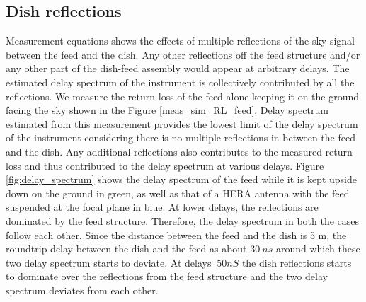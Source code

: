 \documentclass[twocolumn]{emulateapj}
\begin{document}
\subsection{\textbf{Dish reflections}}
Measurement equations shows the effects of multiple reflections of the sky signal between the feed and the dish. Any other reflections off the feed structure and/or any other part of the dish-feed assembly would appear at arbitrary delays. The estimated delay spectrum of the instrument is collectively contributed by all the reflections. We measure the return loss of the feed alone keeping it on the ground facing the sky shown in the Figure \ref{meas_sim_RL_feed}. Delay spectrum estimated from this measurement provides the lowest limit of the delay spectrum of the instrument considering there is no multiple reflections in between the feed and the dish. 
 Any additional reflections also contributes to the measured return loss and thus contributed to the delay spectrum at various delays. Figure \ref{fig:delay_spectrum} shows the delay spectrum of the feed while it is kept upside down on the ground in green, as well as that of a HERA antenna with the feed suspended at the focal plane in blue. At lower delays, the reflections are dominated by the feed structure. Therefore, the delay spectrum in both the cases follow each other. Since the distance between the feed and the dish is 5 m, the roundtrip delay between the dish and the feed as about $30~ns$ around which these two delay spectrum starts to deviate. At delays $\> 50nS$ the dish reflections starts to dominate over the reflections from the feed structure and the two delay spectrum deviates from each other. 
\end{document}
